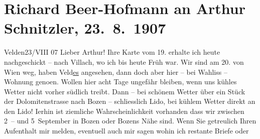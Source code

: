

               \section[Richard Beer-Hofmann an Arthur Schnitzler, 23. 8. 1907]{ Richard Beer-Hofmann an Arthur Schnitzler, 23. 8. 1907}\nopagebreak{}\rehead{ }\begin{ledgroupsized}[t]{13cm}\normalsize\beginnumbering{} \toendnotes[C]{\smallbreak\pagebreak[2]} 
\toendnotes[C]{\smallbreak}\pstart
           \raggedleft{}{\pb}Velden23/VIII 07\pend
           \pstart
           Lieber Arthur! Ihre Karte vom 19. erhalte ich heute
               nachgeschickt – nach Villach, wo ich bis heute
               Früh war. Wir sind am 20. von Wien weg,
               haben Veld\uline{es} angesehen, dann doch aber hier – bei Wahliss
               – Wohnung geno{\geminationm}en. Wollen hier acht Tage ungefähr
               bleiben, wenn uns kühles Wetter nicht vorher südlich treibt. Dann – bei schönem
               Wetter über ein Stück der Dolomitenstrasse nach
                  {\pb}Bozen – schliesslich Lido, bei kühlem Wetter direkt an den Lido!
                  I{\geminationm}erhin ist ziemliche Wahrscheinlichkeit vorhanden
               dass wir zwischen 2 – und 5 September in Bozen oder Bozens Nähe
               sind.\pend
           \pstart
           {\pb}Wenn Sie getreulich Ihren
               Aufenthalt mir melden, eventuell auch mir sagen wohin ich restante Briefe oder

\end{ledgroupsized}
